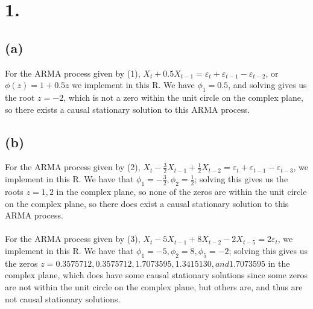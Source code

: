 \documentclass{article}
\begin{document}
\thispagestyle{firstpageheader}

\section*{1.}
{\Large 
\subsection*{(a)}

For the ARMA process given by (1), $X_t + 0.5X_{t-1} = \varepsilon_t + \varepsilon_{t-1} - \varepsilon_{t-2}$, or $\phi(z) = 1 + 0.5z$ we implement in this R. We have $\phi_1 = 0.5$, and solving gives us the root $z = -2$, which is not a zero within the unit circle on the complex plane, so there exists a causal stationary solution to this ARMA process.

\subsection*{(b)}

For the ARMA process given by (2), $X_t - \frac{3}{2}X_{t-1} + \frac{1}{2}X_{t-2}= \varepsilon_t + \varepsilon_{t-1} - \varepsilon_{t-3}$, we implement in this R. We have that $\phi_1 = -\frac{3}{2}, \phi_2 = \frac{1}{2}$; solving this gives us the roots $z = 1, 2$ in the complex plane, so none of the zeros are within the unit circle on the complex plane, so there does exist a causal stationary solution to this ARMA process. \\ \\
For the ARMA process given by (3), $X_t - 5X_{t-1} + 8X_{t-2} - 2X_{t-5}= 2\varepsilon_t$, we implement in this R. We have that $\phi_1 = -5, \phi_2 = 8, \phi_5 = -2$; solving this gives us the zeros $z = 0.3575712, 0.3575712, 1.7073595, 1.3415130, and 1.7073595$ in the complex plane, which does have some causal stationary solutions since some zeros are not within the unit circle on the complex plane, but others are, and thus are not causal stationary solutions.
\newpage

}
\end{document}
